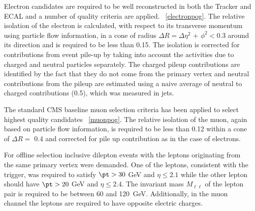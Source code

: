  Electron candidates are required to be well reconstructed in both the Tracker and ECAL and a number of quality criteria are applied.  ~\ref{electronpog}.
The relative isolation of the electron is calculated, with respect to its transverse momentum using particle flow information, in a cone of radius $\Delta R = \Delta\eta^{2}$ + $\phi^{2} < 0.3$ around its direction and is required to be less than 0.15. The isolation is corrected for contributions from event pile-up by taking into account the activities due to charged and neutral particles separately. The charged pileup contributions are identified by the fact that they do not come from the primary vertex and neutral contributions from the pileup are estimated using a naive average of neutral to charged contributions (0.5), which was measured in jets. 


The standard CMS baseline muon selection criteria has been applied to select highest quality candidates ~\ref{muonpog}.
 The relative isolation of the muon, again based on  particle flow information, is required to be less than 0.12  within a cone of $\Delta R =$ 0.4 and corrected for pile up contribution as in the case of electrons.

For offline selection inclusive dilepton events with the leptons originating from the same primary vertex were demanded. One of the leptons, consistent with the trigger, was required to satisfy $\pt > 30$ GeV and $\eta \le 2.1$ while the other lepton should have $\pt > 20$ GeV and $\eta \le 2.4$.
The invariant mass $M_{\ell\ell}$ of the lepton pair is required  to be between 60 and 120~GeV. 
Additionally, in the muon channel the leptons are required to have opposite electric charges.


